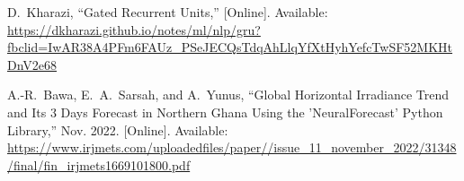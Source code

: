 \documentclass{ieeeojies}
\begin{document}
\begin{thebibliography}{00}
	D.~Kharazi, ``Gated Recurrent Units,'' [Online]. Available: \url{https://dkharazi.github.io/notes/ml/nlp/gru?fbclid=IwAR38A4PFm6FAUz_PSeJECQsTdqAhLlqYfXtHyhYefcTwSF52MKHtDnV2e68}
	
	A.-R.~Bawa, E.~A.~Sarsah, and A.~Yunus, ``Global Horizontal Irradiance Trend and Its 3 Days Forecast in Northern Ghana Using the 'NeuralForecast' Python Library,'' Nov. 2022. [Online]. Available: \url{https://www.irjmets.com/uploadedfiles/paper//issue_11_november_2022/31348/final/fin_irjmets1669101800.pdf}
	
\end{thebibliography}
\EOD
\end{document}
